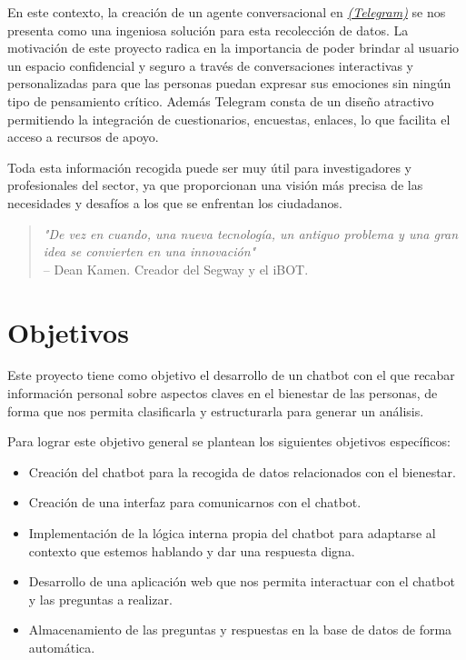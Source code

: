 En este contexto, la creación de un agente conversacional en \href{https://telegram.com.es/}{\textit{(Telegram)}} se nos presenta como una ingeniosa solución para esta recolección de datos. La motivación de este proyecto radica en la importancia de poder brindar al usuario un espacio confidencial y seguro a través de conversaciones interactivas y personalizadas para que las personas puedan expresar sus emociones sin ningún tipo de pensamiento crítico.
Además Telegram consta de un diseño atractivo permitiendo la integración de cuestionarios, encuestas, enlaces, lo que facilita el acceso a recursos de apoyo.\vspace{0.3cm}

Toda esta información recogida puede ser muy útil para investigadores y profesionales del sector, ya que proporcionan una visión más precisa de las necesidades y desafíos a los que se enfrentan los ciudadanos. 


\begin{quote}
    \textit{"De vez en cuando, una nueva tecnología, un antiguo problema y una gran idea se convierten en una innovación"} \\ 
    -- Dean Kamen. Creador del Segway y el iBOT.
\end{quote}

\section{Objetivos}

Este proyecto tiene como objetivo el desarrollo de un chatbot con el que recabar información personal sobre aspectos claves en el bienestar de las personas, de forma que nos permita clasificarla y estructurarla para generar un análisis. 

Para lograr este objetivo general se plantean los siguientes objetivos específicos:

\begin{itemize}
    \item Creación del chatbot para la recogida de datos relacionados con el bienestar.
    \item Creación de una interfaz para comunicarnos con el chatbot.
    \item Implementación de la lógica interna propia del chatbot para adaptarse al contexto que estemos hablando y dar una respuesta digna.
    \item Desarrollo de una aplicación web que nos permita interactuar con el chatbot y las preguntas a realizar.
    \item Almacenamiento de las preguntas y respuestas en la base de datos de forma automática.
\end{itemize}

